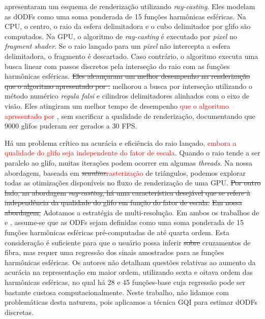 

 apresentaram um esquema de renderização utilizando \textit{ray-casting}. Eles modelam as dODFs como uma soma ponderada de 15 funções harmônicas esféricas. Na CPU, o centro, o raio da esfera delimitadora e o cubo delimitador por glifo são computados. Na GPU, o algoritmo de \textit{ray-casting} é executado por \textit{pixel} no \textit{fragment shader}. Se o raio lançado para um \textit{pixel} não intercepta a esfera delimitadora, o fragmento é descartado. Caso contrário, o algoritmo executa uma busca linear com passos discretos pela interseção do raio com as funções harmônicas esféricas. \sout{Eles alcançaram um melhor desempenho na renderização que o algoritmo apresentado por .}  melhorou a busca por interseção utilizando o método numérico \textit{regula falsi} e cilindros delimitadores alinhados com o eixo de visão. Eles atingiram um melhor tempo de desempenho \textcolor{red}{que o algoritmo apresentado por }, sem sacrificar a qualidade de renderização, documentando que 9000 glifos puderam ser gerados a 30 FPS. 

Há um problema crítico na acurácia e eficiência do raio lançado\textcolor{red}{, embora a qualidade do glifo seja independente do fator de escala}. Quando o raio tende a ser paralelo ao glifo, muitas iterações podem ocorrer em algumas \textit{threads}. Na nossa abordagem, baseada em \sout{\textit{scanline}}\textcolor{red}{rasterização} de triângulos, podemos explorar todas as otimizações disponíveis no fluxo de renderização de uma GPU. \sout{Por outro lado,
na abordagem \textit{ray-casting}, há uma característica desejável que se refere à independência da qualidade do glifo em função do fator de escala.} \sout{Em nossa abordagem,} Adotamos a estratégia de multi-resolução.
Em ambos os trabalhos de  e , assume-se que as ODFs sejam definidas como uma soma ponderada de 15 funções harmônicas esféricas pré-computadas de até quarta ordem. Esta consideração é suficiente para que o usuário possa inferir \sout{sobre} cruzamentos de fibra, mas requer uma regressão dos sinais amostrados para as funções harmônicas esféricas. Os autores não detalham questões relativas ao aumento da acurácia na representação em maior ordem, utilizando sexta e oitava ordem das harmônicas esféricas, no qual há 28 e 45 funções-base \cite{descoteaux2007_QBI} cuja regressão pode ser bastante custosa computacionalmente. Neste trabalho, não lidamos com problemáticas desta natureza, pois aplicamos a técnica GQI para estimar dODFs discretas.

